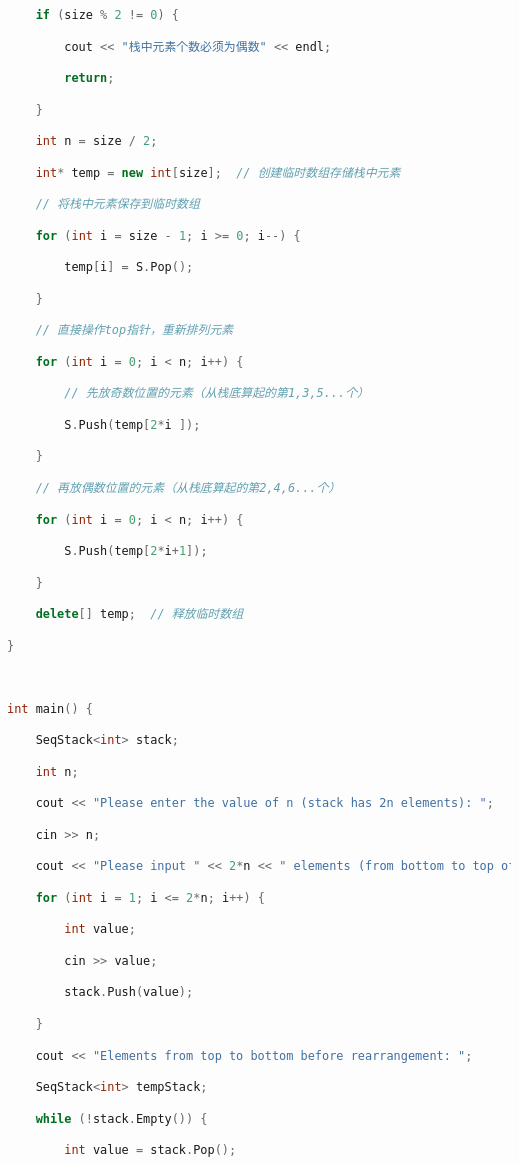 \begin{lstlisting}[language=C++]
    if (size % 2 != 0) {

        cout << "栈中元素个数必须为偶数" << endl;

        return;

    }

    int n = size / 2;

    int* temp = new int[size];  // 创建临时数组存储栈中元素

    // 将栈中元素保存到临时数组

    for (int i = size - 1; i >= 0; i--) {

        temp[i] = S.Pop();

    }

    // 直接操作top指针，重新排列元素

    for (int i = 0; i < n; i++) {

        // 先放奇数位置的元素（从栈底算起的第1,3,5...个）

        S.Push(temp[2*i ]);

    }

    // 再放偶数位置的元素（从栈底算起的第2,4,6...个）

    for (int i = 0; i < n; i++) {

        S.Push(temp[2*i+1]);

    }

    delete[] temp;  // 释放临时数组

}

  

int main() {

    SeqStack<int> stack;

    int n;

    cout << "Please enter the value of n (stack has 2n elements): ";

    cin >> n;

    cout << "Please input " << 2*n << " elements (from bottom to top of stack):" << endl;

    for (int i = 1; i <= 2*n; i++) {

        int value;

        cin >> value;

        stack.Push(value);

    }

    cout << "Elements from top to bottom before rearrangement: ";

    SeqStack<int> tempStack;

    while (!stack.Empty()) {

        int value = stack.Pop();


\end{lstlisting}
